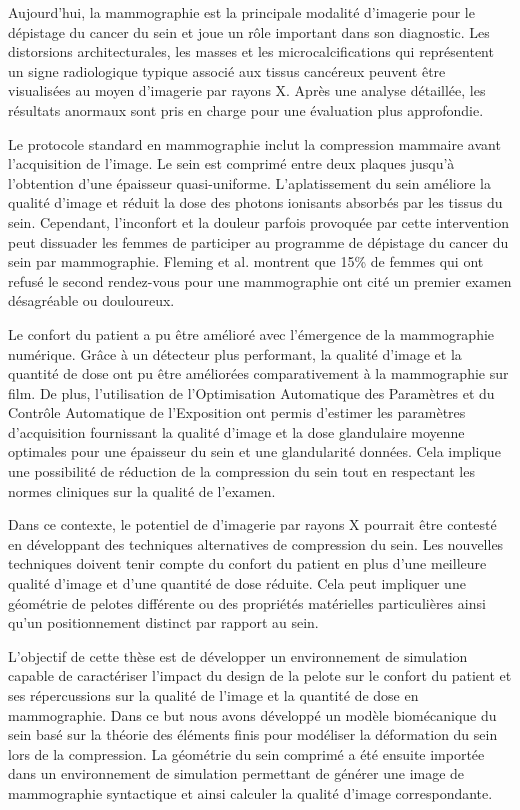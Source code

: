 
Aujourd'hui, la mammographie est la principale modalité d'imagerie pour le dépistage du cancer du sein et joue un rôle important dans son diagnostic. Les distorsions architecturales, les masses et les microcalcifications qui représentent un signe radiologique typique associé aux tissus cancéreux peuvent être visualisées au moyen d'imagerie par rayons X. Après une analyse détaillée, les résultats anormaux sont pris en charge pour une évaluation plus approfondie.

Le protocole standard en mammographie inclut la compression mammaire avant l'acquisition de l'image. Le sein est comprimé entre deux plaques jusqu'à l'obtention d'une épaisseur quasi-uniforme. L'aplatissement du sein améliore la qualité d'image et réduit la dose des photons ionisants absorbés par les tissus du sein. Cependant, l'inconfort et la douleur parfois provoquée par cette intervention peut dissuader les femmes de participer au programme de dépistage du cancer du sein par mammographie. Fleming et al. \citep{fleming_intermittent_2013} montrent que 15\% de femmes qui ont refusé le second rendez-vous pour une mammographie ont cité un premier examen désagréable ou douloureux.

Le confort du patient a pu être amélioré avec l'émergence de la mammographie numérique. Grâce à un détecteur plus performant, la qualité d'image et la quantité de dose ont pu être améliorées comparativement à la mammographie sur film. De plus, l'utilisation de l'Optimisation Automatique des Paramètres et du Contrôle Automatique de l'Exposition ont permis d'estimer les paramètres d'acquisition fournissant la qualité d'image et la dose glandulaire moyenne optimales pour une épaisseur du sein et une glandularité données. Cela implique une possibilité de réduction de la compression du sein tout en respectant les normes cliniques sur la qualité de l'examen.

Dans ce contexte, le potentiel de d'imagerie par rayons X pourrait être contesté en développant des techniques alternatives de compression du sein. Les nouvelles techniques doivent tenir compte du confort du patient en plus d'une meilleure qualité d'image et d'une quantité de dose réduite. Cela peut impliquer une géométrie de pelotes différente ou des propriétés matérielles particulières ainsi qu'un positionnement distinct par rapport au sein.

L'objectif de cette thèse est de développer un environnement de simulation capable de caractériser l'impact du design de la pelote sur le confort du patient et ses répercussions sur la qualité de l'image et la quantité de dose en mammographie. Dans ce but nous avons développé un modèle biomécanique du sein basé sur la théorie des éléments finis pour modéliser la déformation du sein lors de la compression. La géométrie du sein comprimé a été ensuite importée dans un environnement de simulation permettant de générer une image de mammographie syntactique et ainsi calculer la qualité d'image correspondante. 

